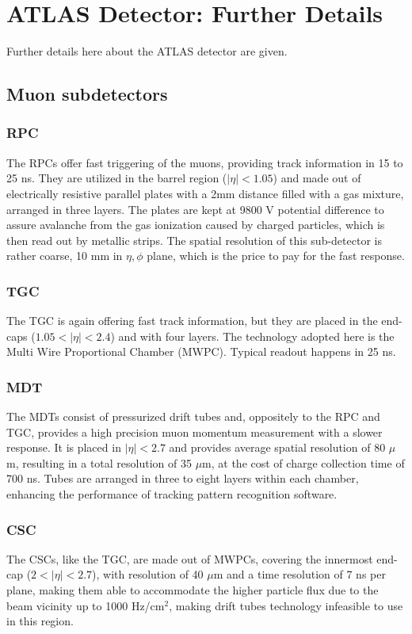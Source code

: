 \chapter{ATLAS Detector: Further Details}
Further details here about the ATLAS detector are given.
\section{Muon subdetectors}
\subsection{RPC}
The RPCs offer fast triggering of the muons, providing track information in 15 to 25 ns. They are utilized in the barrel region ($|\eta|<1.05$) and made out of electrically resistive parallel plates with a 2mm distance filled with a gas mixture, arranged in three layers. The plates are kept at 9800 V potential difference to assure avalanche from the gas ionization caused by charged particles, which is then read out by metallic strips. The spatial resolution of this sub-detector is rather coarse, 10 mm in $\eta,\phi$ plane, which is the price to pay for the fast response.  

\subsection{TGC}
The TGC is again offering fast track information, but they are placed in the end-caps ($1.05<|\eta|<2.4$) and with four layers. The technology adopted here is the Multi Wire Proportional Chamber (MWPC). Typical readout happens in 25 ns.

\subsection{MDT}
The MDTs consist of pressurized drift tubes and, oppositely to the RPC and TGC, provides a high precision muon momentum measurement with a slower response. It is placed in $|\eta|<2.7$ and provides average spatial resolution of 80 $\mu$m, resulting in a total resolution of 35 $\mu$m, at the cost of charge collection time of 700 ns.
Tubes are arranged in three to eight layers within each chamber, enhancing the performance of tracking pattern recognition software.

\subsection{CSC}
The CSCs, like the TGC, are made out of MWPCs, covering the innermost end-cap ($2<|\eta|<2.7$), with resolution of 40 $\mu$m and a time resolution of 7 ns per plane, making them able to accommodate the higher particle flux due to the beam vicinity up to 1000 Hz/cm$^2$, making drift tubes technology infeasible to use in this region.

